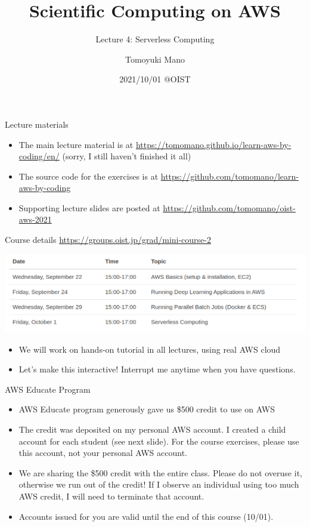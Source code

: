 \documentclass[unicode,11pt]{beamer}
\title{Scientific Computing on AWS}
\subtitle{Lecture 4: Serverless Computing}
\author{Tomoyuki Mano}
\institute[OIST]{Okinawa Institute of Science and Technology}
\date{2021/10/01 @OIST}
\begin{document}
\frame{\titlepage}

\begin{frame}{Lecture materials}
\begin{itemize}
    \item The main lecture material is at
    \url{https://tomomano.github.io/learn-aws-by-coding/en/}
    (sorry, I still haven't finished it all)
    \item The source code for the exercises is at
    \url{https://github.com/tomomano/learn-aws-by-coding}
    \item Supporting lecture slides are posted at
    \url{https://github.com/tomomano/oist-aws-2021}
\end{itemize}
\end{frame}

\begin{frame}{Course details}
\centering
\url{https://groups.oist.jp/grad/mini-course-2}

\vspace{10pt}

\includegraphics[width=1.0\textwidth]{imgs/schedule.png}

\begin{itemize}
    \item We will work on hands-on tutorial in all lectures, using real AWS cloud
    \item Let's make this interactive! Interrupt me anytime when you have questions.
\end{itemize}
\end{frame}

\begin{frame}{AWS Educate Program}

\begin{itemize}
    \item AWS Educate program generously gave us \$500 credit to use on AWS
    \item The credit was deposited on my personal AWS account.
    I created a child account for each student (see next slide).
    For the course exercises, please use this account, not your personal AWS account.
    \item We are sharing the \$500 credit with the entire class.
    Please do not overuse it, otherwise we run out of the credit!
    If I observe an individual using too much AWS credit, I will need to terminate that account.
    \item Accounts issued for you are valid until the end of this course (10/01).
\end{itemize}
\end{frame}
\end{document}

